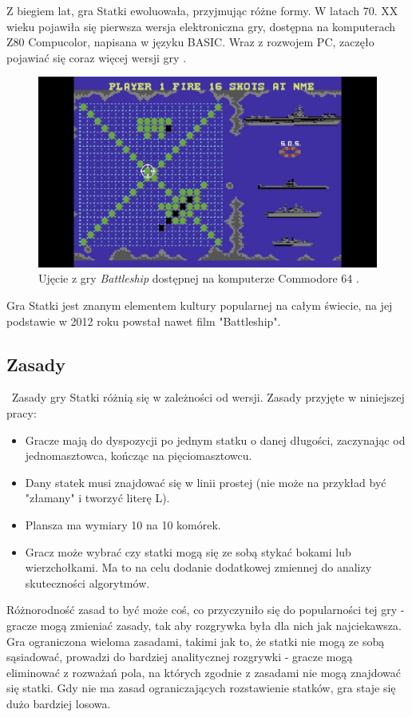  \indent Z biegiem lat, gra Statki ewoluowała, przyjmując różne formy. W latach 70. XX wieku pojawiła się pierwsza wersja elektroniczna gry, dostępna na komputerach Z80 Compucolor, napisana w języku BASIC. Wraz z rozwojem PC, zaczęło pojawiać się coraz więcej wersji gry \cite{historyWiki} \cite{museumOfGames}.

 \begin{figure}[!h]
    \label{fig:commodore_64}
    \centering \includegraphics[width=0.8\linewidth]{img/commodore_64.jpg}
    \caption{Ujęcie z gry \emph{Battleship} dostępnej na komputerze Commodore 64 \cite{commodore64}.}
\end{figure}

\indent Gra Statki jest znanym elementem kultury popularnej na całym świecie, na jej podstawie w 2012 roku powstał nawet film "Battleship".
\subsection{Zasady}
\indent\ Zasady gry Statki różnią się w zależności od wersji. Zasady przyjęte w niniejszej pracy:
\begin{itemize}
  \item Gracze mają do dyspozycji po jednym statku o danej długości, zaczynając od jednomasztowca, kończąc na pięciomasztowcu.
  \item Dany statek musi znajdować się w linii prostej (nie może na przykład być "złamany" i tworzyć literę L).
  \item Plansza ma wymiary 10 na 10 komórek.
  \item Gracz może wybrać czy statki mogą się ze sobą stykać bokami lub wierzchołkami. Ma to na celu dodanie dodatkowej zmiennej do analizy skuteczności algorytmów.
\end{itemize}

Różnorodność zasad to być może coś, co przyczyniło się do popularności tej gry - gracze mogą zmieniać zasady, tak aby rozgrywka była dla nich jak najciekawsza. Gra ograniczona wieloma zasadami, takimi jak to, że statki nie mogą ze sobą sąsiadować, prowadzi do bardziej analitycznej rozgrywki - gracze mogą eliminować z rozważań pola, na których zgodnie z zasadami nie mogą znajdować się statki. Gdy nie ma zasad ograniczających rozstawienie statków, gra staje się dużo bardziej losowa.